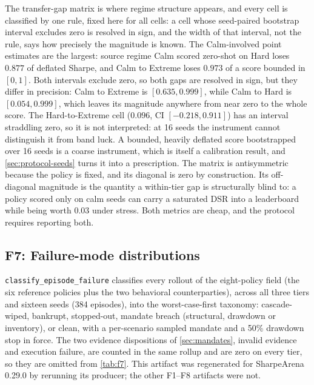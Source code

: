 The transfer-gap matrix is where regime structure appears, and every cell is classified by one rule, fixed here for all cells: a cell whose seed-paired bootstrap interval excludes zero is resolved in sign, and the width of that interval, not the rule, says how precisely the magnitude is known. The Calm-involved point estimates are the largest: source regime Calm scored zero-shot on Hard loses $0.877$ of deflated Sharpe, and Calm to Extreme loses $0.973$ of a score bounded in $[0,1]$. Both intervals exclude zero, so both gaps are resolved in sign, but they differ in precision: Calm to Extreme is $[0.635, 0.999]$, while Calm to Hard is $[0.054, 0.999]$, which leaves its magnitude anywhere from near zero to the whole score. The Hard-to-Extreme cell ($0.096$, CI $[-0.218, 0.911]$) has an interval straddling zero, so it is not interpreted: at 16 seeds the instrument cannot distinguish it from band luck. A bounded, heavily deflated score bootstrapped over 16 seeds is a coarse instrument, which is itself a calibration result, and \cref{sec:protocol-seeds} turns it into a prescription. The matrix is antisymmetric because the policy is fixed, and its diagonal is zero by construction. Its off-diagonal magnitude is the quantity a within-tier gap is structurally blind to: a policy scored only on calm seeds can carry a saturated DSR into a leaderboard while being worth 0.03 under stress. Both metrics are cheap, and the protocol requires reporting both.

\subsection{F7: Failure-mode distributions}\label{sec:f7}

\texttt{classify\_episode\_failure} classifies every rollout of the eight-policy field (the six reference policies plus the two behavioral counterparties), across all three tiers and sixteen seeds (384 episodes), into the worst-case-first taxonomy: cascade-wiped, bankrupt, stopped-out, mandate breach (structural, drawdown or inventory), or clean, with a per-scenario sampled mandate and a 50\% drawdown stop in force. The two evidence dispositions of \cref{sec:mandates}, invalid evidence and execution failure, are counted in the same rollup and are zero on every tier, so they are omitted from \cref{tab:f7}. This artifact was regenerated for SharpeArena 0.29.0 by rerunning its producer; the other F1--F8 artifacts were not.

